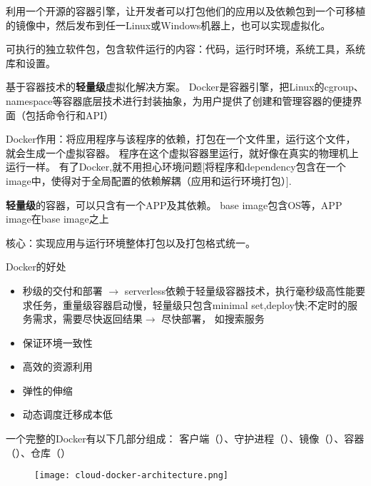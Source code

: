 \begin{definition}[容器]
    利用一个开源的容器引擎，让开发者可以打包他们的应用以及依赖包到一个可移植的镜像中，然后发布到任一Linux或Windows机器上，也可以实现虚拟化。 
\end{definition}

\begin{definition}[镜像]
    可执行的独立软件包，包含软件运行的内容：代码，运行时环境，系统工具，系统库和设置。 
\end{definition}

\begin{definition}[Docker]
    基于容器技术的\textbf{轻量级}虚拟化解决方案。 Docker是容器引擎，把Linux的cgroup、namespace等容器底层技术进行封装抽象，为用户提供了创建和管理容器的便捷界面（包括命令行和API）

\end{definition}

Docker作用：将应用程序与该程序的依赖，打包在一个文件里，运行这个文件，就会生成一个虚拟容器。 程序在这个虚拟容器里运行，就好像在真实的物理机上运行一样。 有了Docker,就不用担心环境问题[将程序和dependency包含在一个image中，使得对于全局配置的依赖解耦（应用和运行环境打包）]. 

\textbf{轻量级}的容器，可以只含有一个APP及其依赖。 base image包含OS等，APP image在base image之上

核心：实现应用与运行环境整体打包以及打包格式统一。 

Docker的好处

\begin{itemize}
    \item 秒级的交付和部署 $\rightarrow$ serverless依赖于轻量级容器技术，执行毫秒级高性能要求任务，重量级容器启动慢，轻量级只包含minimal set,deploy快;不定时的服务需求，需要尽快返回结果$\rightarrow$ 尽快部署， 如搜索服务
    \item 保证环境一致性
    \item 高效的资源利用
    \item 弹性的伸缩
    \item 动态调度迁移成本低
\end{itemize}

一个完整的Docker有以下几部分组成：
客户端（）、守护进程（）、镜像（）、容器（）、仓库（）

\begin{figure}[htbp]
    \centering
    \texttt{[image: cloud-docker-architecture.png]}
\end{figure}

